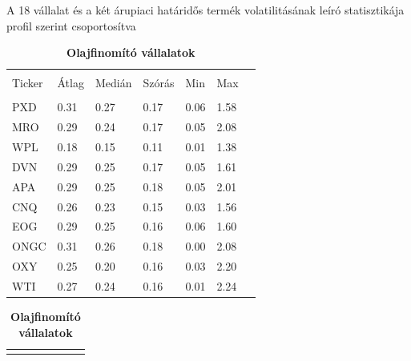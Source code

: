 \documentclass[12pt,bibliography=totoc]{article}
\begin{document}
\begin{table}[H]
\caption{A 18 vállalat és a két árupiaci határidős termék volatilitásának leíró statisztikája profil szerint csoportosítva} %
\fontsize{9}{9}\selectfont
\centering
\begin{subtable}[t]{0.45\textwidth}
\centering
\begin{tabular}{l | l l l l l l}%
\hline\hline \\ [-1.5ex]                         %
		
Ticker &Átlag	&Medián	&Szórás	&Min&	Max \\
\hline \\ [-1.5ex] 
PXD		&0.31&	0.27&	0.17&	0.06&	1.58 \\
MRO	&0.29&	0.24&	0.17&	0.05&	2.08 \\
WPL		&0.18&	0.15&	0.11&	0.01&	1.38 \\
DVN	      &0.29&	0.25&	0.17&	0.05&	1.61 \\
APA		&0.29&	0.25&	0.18&	0.05&	2.01 \\
CNQ		&0.26&	0.23&	0.15&	0.03&	1.56 \\
EOG		&0.29&	0.25&	0.16&	0.06&	1.60 \\
ONGC	&0.31&	0.26&	0.18&	0.00&	2.08 \\
OXY		&0.25&	0.20&	0.16&	0.03&	2.20 \\
WTI	      &0.27&	0.24&	0.16&	0.01&	2.24 \\



\hline            
\end{tabular}
\caption{\textbf{Olajfinomító vállalatok}}
\end{subtable}
\hspace{\fill}
\begin{subtable}[t]{0.45\textwidth}
\centering
\begin{tabular}{l | l l l l l l}%
\hline\hline \\ [-1.5ex]                         %




\end{tabular}
\end{subtable}
\end{table}
\end{document}
